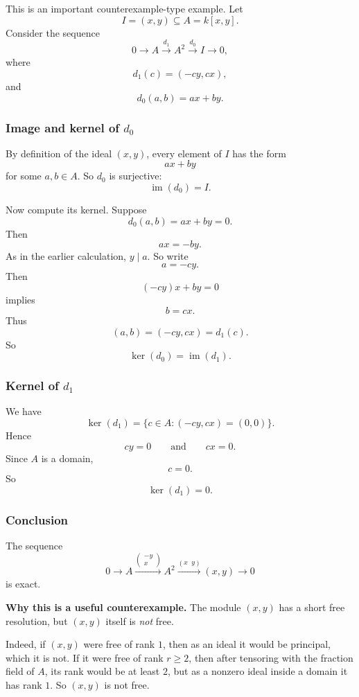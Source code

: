 \documentclass[12pt,a4paper]{article}
\theoremstyle{notespace}
\theoremstyle{definition}
\begin{document}
This is an important counterexample-type example.
Let
\[
I=(x,y)\subseteq A=k[x,y].
\]
Consider the sequence
\[
0 \longrightarrow A \xrightarrow{d_1} A^2 \xrightarrow{d_0} I \longrightarrow 0,
\]
where
\[
d_1(c)=(-cy,cx),
\]
and
\[
d_0(a,b)=ax+by.
\]

\subsubsection*{Image and kernel of \(d_0\)}

By definition of the ideal \((x,y)\), every element of \(I\) has the form
\[
ax+by
\]
for some \(a,b\in A\).
So \(d_0\) is surjective:
\[
\operatorname{im}(d_0)=I.
\]

Now compute its kernel.
Suppose
\[
d_0(a,b)=ax+by=0.
\]
Then
\[
ax=-by.
\]
As in the earlier calculation, \(y\mid a\).
So write
\[
a=-cy.
\]
Then
\[
(-cy)x+by=0
\]
implies
\[
b=cx.
\]
Thus
\[
(a,b)=(-cy,cx)=d_1(c).
\]
So
\[
\ker(d_0)=\operatorname{im}(d_1).
\]

\subsubsection*{Kernel of \(d_1\)}

We have
\[
\ker(d_1)=\{c\in A : (-cy,cx)=(0,0)\}.
\]
Hence
\[
cy=0
\qquad\text{and}\qquad
cx=0.
\]
Since \(A\) is a domain,
\[
c=0.
\]
So
\[
\ker(d_1)=0.
\]

\subsubsection*{Conclusion}

The sequence
\[
0 \longrightarrow A \xrightarrow{\begin{pmatrix}-y\\x\end{pmatrix}} A^2 \xrightarrow{(x\;\;y)} (x,y) \longrightarrow 0
\]
is exact.

\medskip

\textbf{Why this is a useful counterexample.}
The module \((x,y)\) has a short free resolution, but \((x,y)\) itself is \emph{not} free.

Indeed, if \((x,y)\) were free of rank \(1\), then as an ideal it would be principal, which it is not.
If it were free of rank \(r\ge 2\), then after tensoring with the fraction field of \(A\), its rank would be at least \(2\), but as a nonzero ideal inside a domain it has rank \(1\).
So \((x,y)\) is not free.
\end{document}
